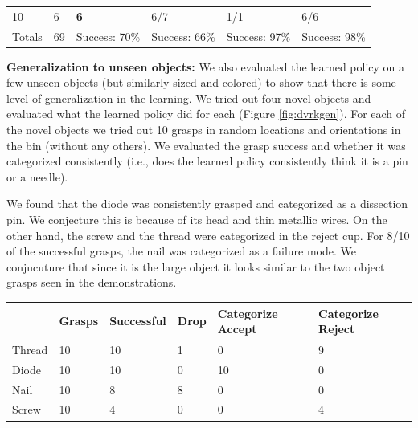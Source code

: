 \begin{table}[ht!]
\begin{tabular}{llllll}
10                              & 6                                    & {\color[HTML]{32CB00} \textbf{6}}         & 6/7                             & 1/1                             & 6/6                                   \\
Totals                          & 69                                   & Success: 70\%                             & Success: 66\%                   & Success: 97\%                   & Success: 98\%                        
\end{tabular}
\end{table}



\vspace{0.25em} \noindent \textbf{Generalization to unseen objects: } We also evaluated the learned policy on a few unseen objects (but similarly sized and colored) to show that there is some level of generalization in the learning. We tried out four novel objects and evaluated what the learned policy did for each (Figure \ref{fig:dvrkgen}). For each of the novel objects we tried out 10 grasps in random locations and orientations in the bin (without any others). We evaluated the grasp success and whether it was categorized consistently (i.e., does the learned policy consistently think it is a pin or a needle).

We found that the diode was consistently grasped and categorized as a dissection pin. We conjecture this is because of its head and thin metallic wires. On the other hand, the screw and the thread were categorized in the reject cup. For 8/10 of the successful grasps, the nail was categorized as a failure mode. We conjucuture that since it is the large object it looks similar to the two object grasps seen in the demonstrations.

\begin{table}[ht!]\footnotesize
\centering
\label{my-label}
\begin{tabular}{l|l|l|l|l|l}
       & Grasps & Successful & Drop & Categorize Accept & Categorize Reject \\
       \hline
Thread & 10     & 10         & 1    & 0              & 9                 \\
Diode  & 10     & 10         & 0    & 10             & 0                 \\
Nail   & 10     & 8          & 8    & 0              & 0                 \\
Screw  & 10     & 4          & 0    & 0              & 4                
\end{tabular}
\end{table}



